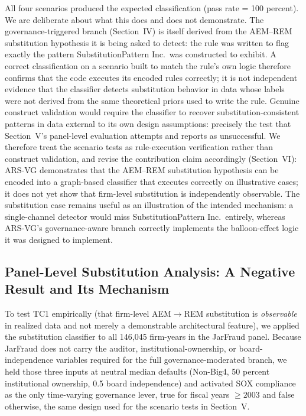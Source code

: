 \documentclass[12pt]{article}
\begin{document}
All four scenarios produced the expected classification (pass rate =
100 percent).  We are deliberate about what this does and does not
demonstrate.  The governance-triggered branch (Section~IV) is itself
derived from the AEM--REM substitution hypothesis it is being asked to
detect: the rule was written to flag exactly the pattern
SubstitutionPattern Inc.\ was constructed to exhibit.  A correct
classification on a scenario built to match the rule's own logic
therefore confirms that the code executes its encoded rules correctly;
it is not independent evidence that the classifier detects
substitution behavior in data whose labels were not derived from the
same theoretical priors used to write the rule.  Genuine construct
validation would require the classifier to recover
substitution-consistent patterns in data external to its own design
assumptions: precisely the test that Section~V's panel-level
evaluation attempts and reports as unsuccessful.  We therefore treat
the scenario tests as rule-execution verification rather than
construct validation, and revise the contribution claim accordingly
(Section~VI): ARS-VG demonstrates that the AEM--REM substitution
hypothesis can be encoded into a graph-based classifier that executes
correctly on illustrative cases; it does not yet show that firm-level
substitution is independently observable.  The substitution case
remains useful as an illustration of the intended mechanism: a
single-channel detector would miss SubstitutionPattern Inc.\ entirely,
whereas ARS-VG's governance-aware branch correctly implements the
balloon-effect logic it was designed to implement.

\subsection*{Panel-Level Substitution Analysis: A Negative Result and Its Mechanism}
\label{subsec:panel-substitution}

To test TC1 empirically (that firm-level AEM$\to$REM substitution is
\emph{observable} in realized data and not merely a demonstrable
architectural feature), we applied the substitution classifier to all
146{,}045 firm-years in the JarFraud panel.  Because JarFraud does not
carry the auditor, institutional-ownership, or board-independence
variables required for the full governance-moderated branch, we held
those three inputs at neutral median defaults (Non-Big4, 50 percent
institutional ownership, 0.5 board independence) and activated SOX
compliance as the only time-varying governance lever, true for fiscal
years $\geq 2003$ and false otherwise, the same design used for the
scenario tests in Section~V.
\end{document}
